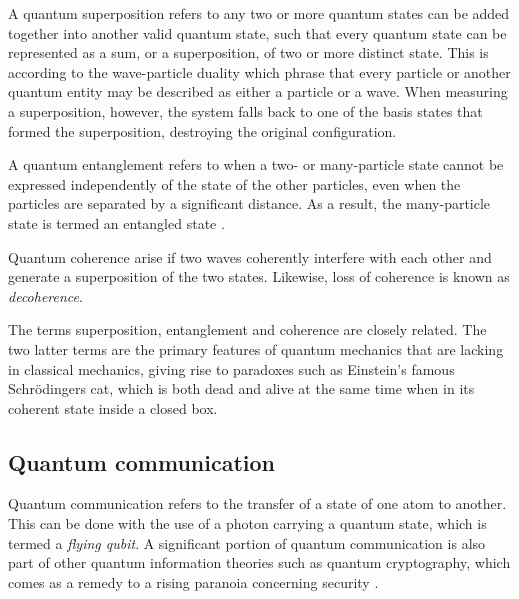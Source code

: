 A quantum superposition refers to any two or more quantum states can be added together into another valid quantum state, such that every quantum state can be represented as a sum, or a superposition, of two or more distinct state. This is according to the wave-particle duality which phrase that every particle or another quantum entity may be described as either a particle or a wave. When measuring a superposition, however, the system falls back to one of the basis states that formed the superposition, destroying the original configuration.

A quantum entanglement refers to when a two- or many-particle state cannot be expressed independently of the state of the other particles, even when the particles are separated by a significant distance. As a result, the many-particle state is termed an entangled state \cite{Griffiths2017}.

Quantum coherence arise if two waves coherently interfere with each other and generate a superposition of the two states. Likewise, loss of coherence is known as \textit{decoherence}.

The terms superposition, entanglement and coherence are closely related. The two latter terms are the primary features of quantum mechanics that are lacking in classical mechanics, giving rise to paradoxes such as Einstein's famous Schrödingers cat, which is both dead and alive at the same time when in its coherent state inside a closed box.

\subsection{Quantum communication}

Quantum communication refers to the transfer of a state of one atom to another. This can be done with the use of a photon carrying a quantum state, which is termed a \textit{flying qubit}. A significant portion of quantum communication is also part of other quantum information theories such as quantum cryptography, which comes as a remedy to a rising paranoia concerning security \cite{Griffiths2002, Pavicic2006}.


